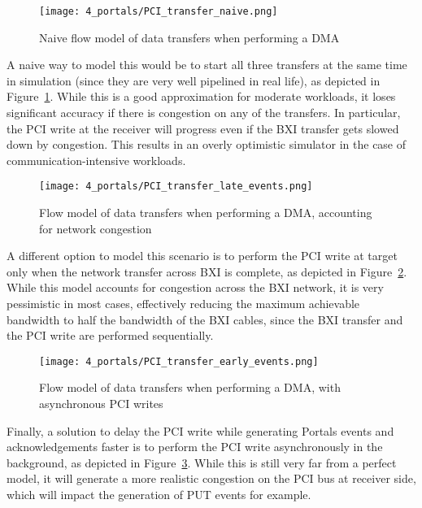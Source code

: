 \begin{figure}[!ht]
    \centering
    \texttt{[image: 4\_portals/PCI\_transfer\_naive.png]}
    \caption{Naive flow model of data transfers when performing a DMA}
    \label{fig:4_portals:PCI_transfer_naive}
\end{figure}

A naive way to model this would be to start all three transfers at the same time
in simulation (since they are very well pipelined in real life), as depicted in
Figure~\ref{fig:4_portals:PCI_transfer_naive}. While this is a good
approximation for moderate workloads, it loses significant accuracy if there is
congestion on any of the transfers. In particular, the PCI write at the receiver
will progress even if the BXI transfer gets slowed down by congestion. This
results in an overly optimistic simulator in the case of communication-intensive
workloads.

\begin{figure}[!ht]
    \centering
    \texttt{[image: 4\_portals/PCI\_transfer\_late\_events.png]}
    \caption{Flow model of data transfers when performing a DMA, accounting for network congestion}
    \label{fig:4_portals:PCI_transfer_late_events}
\end{figure}

A different option to model this scenario is to perform the PCI write at target
only when the network transfer across BXI is complete, as depicted in
Figure~\ref{fig:4_portals:PCI_transfer_late_events}. While this model accounts
for congestion across the BXI network, it is very pessimistic in most cases,
effectively reducing the maximum achievable bandwidth to half the bandwidth of
the BXI cables, since the BXI transfer and the PCI write are performed sequentially.

\begin{figure}[!ht]
    \centering
    \texttt{[image: 4\_portals/PCI\_transfer\_early\_events.png]}
    \caption{Flow model of data transfers when performing a DMA, with asynchronous PCI writes}
    \label{fig:4_portals:PCI_transfer_early_events}
\end{figure}

Finally, a solution to delay the PCI write while generating Portals events and
acknowledgements faster is to perform the PCI write asynchronously in the
background, as depicted in Figure~\ref{fig:4_portals:PCI_transfer_early_events}.
While this is still very far from a perfect model, it will generate a more
realistic congestion on the PCI bus at receiver side, which will impact the
generation of PUT events for example.

